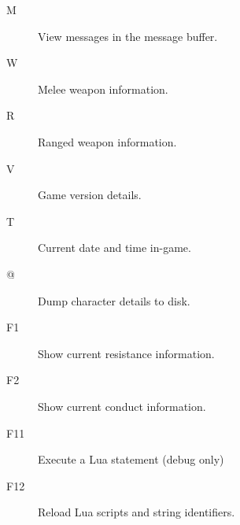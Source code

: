 \begin{description}
\item[M]
View messages in the message buffer.
\item[W] 
Melee weapon information.
\item[R] 
Ranged weapon information.
\item[V] 
Game version details.
\item[T] 
Current date and time in-game.
\item[@] 
Dump character details to disk.
\item[F1] 
Show current resistance information.
\item[F2] 
Show current conduct information.
\item[F11] 
Execute a Lua statement (debug only)
\item[F12] 
Reload Lua scripts and string identifiers.
\end{description}

